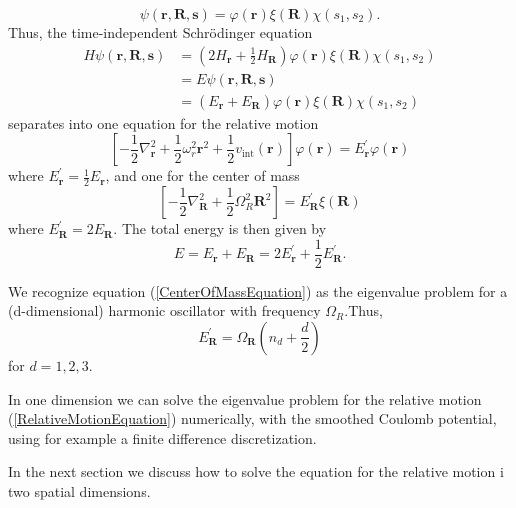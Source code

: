 \documentclass[aip,jcp,reprint,floatfix]{revtex4-1}
\begin{document}
\begin{appendices}
\begin{equation}
    \psi(\mathbf{r},\mathbf{R},\mathbf{s}) = \varphi(\mathbf{r}) \xi(\mathbf{R}) \chi(s_1,s_2).
\end{equation}
Thus, the time-independent Schrödinger equation 
\begin{align}
    H\psi(\mathbf{r},\mathbf{R},\mathbf{s}) &= \left( 2 H_\mathbf{r} + \frac{1}{2}H_\mathbf{R} \right) \varphi(\mathbf{r}) \xi(\mathbf{R}) \chi(s_1,s_2) \\ 
    &= E\psi(\mathbf{r},\mathbf{R},\mathbf{s}) \\
    &= \left( E_\mathbf{r} + E_\mathbf{R} \right) \varphi(\mathbf{r}) \xi(\mathbf{R}) \chi(s_1,s_2)
\end{align}
separates into one equation for the relative motion
\begin{equation}
    \left[- \frac{1}{2}\nabla_\mathbf{r}^2 + \frac{1}{2} \omega_r^2 \mathbf{r}^2 + \frac{1}{2}v_{\text{int}}(\mathbf{r}) \right] \varphi(\mathbf{r}) = E^\prime_\mathbf{r} \varphi(\mathbf{r}) \label{RelativeMotionEquation}
\end{equation}
where $E^\prime_\mathbf{r} = \frac{1}{2}E_\mathbf{r}$, and one for the center of mass 
\begin{equation}
    \left[- \frac{1}{2}\nabla_\mathbf{R}^2 + \frac{1}{2}\Omega_R^2 \mathbf{R}^2 \right] = E^\prime_\mathbf{R} \xi(\mathbf{R}) \label{CenterOfMassEquation}
\end{equation}
where $E^\prime_\mathbf{R} = 2 E_\mathbf{R}$. The total energy is then given by 
\begin{equation}
    E = E_\mathbf{r} + E_\mathbf{R} = 2E^\prime_\mathbf{r} + \frac{1}{2}E^\prime_\mathbf{R}.
\end{equation}

We recognize equation (\ref{CenterOfMassEquation}) as the eigenvalue problem for a (d-dimensional) harmonic oscillator with frequency $\Omega_R$.Thus, 
\begin{equation}
    E_\mathbf{R}^\prime = \Omega_\mathbf{R} \left( n_d + \frac{d}{2} \right)
\end{equation}
for $d=1,2,3$.

In one dimension we can solve the eigenvalue problem for the relative motion (\ref{RelativeMotionEquation}) numerically, with the smoothed Coulomb potential, using for example a finite difference discretization.

In the next section we discuss how to solve the equation for the relative motion i two spatial dimensions.   


\end{appendices}
\end{document}
